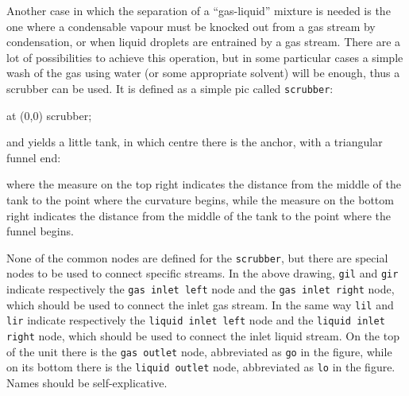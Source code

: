 \documentclass[12pt]{article}						%
\newcommand*{\chpn}[1]{\texttt{#1}}				%
\newcommand*{\chpp}[1]{\texttt{#1}}				%
\begin{document}
Another case in which the separation of a ``gas-liquid'' mixture is needed is
the one where a condensable vapour must be knocked out from a gas stream by
condensation, or when liquid droplets are entrained by a gas stream. There are a
lot of possibilities to achieve this operation, but in some particular cases a
simple wash of the gas using water (or some appropriate solvent) will be
enough, thus a scrubber can be used. It is defined as a simple pic called
\chpp{scrubber}:
\begin{chpcode}
	\pic at (0,0) {scrubber};
\end{chpcode}
and yields a little tank, in which centre there is the anchor, with a triangular
funnel end:
\begin{center}
\end{center}
where the measure on the top right indicates the distance from the middle of the
tank to the point where the curvature begins, while the measure on the bottom
right indicates the distance from the middle of the tank to the point where the
funnel begins.

None of the common nodes are defined for the \chpp{scrubber}, but there are
special nodes to be used to connect specific streams. In the above drawing,
\chpn{gil} and \chpn{gir} indicate respectively the \chpn{gas inlet left} node
and the \chpn{gas inlet right} node, which should be used to connect the inlet
gas stream. In the same way \chpn{lil} and \chpn{lir} indicate respectively the
\chpn{liquid inlet left} node and the \chpn{liquid inlet right} node, which
should be used to connect the inlet liquid stream. On the top of the unit there
is the \chpn{gas outlet} node, abbreviated as \chpn{go} in the figure, while on
its bottom there is the \chpn{liquid outlet} node, abbreviated as \chpn{lo} in
the figure. Names should be self-explicative.
\end{document}
